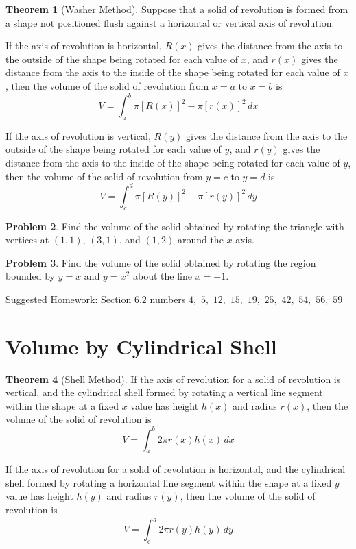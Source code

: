 \documentclass[letterpaper, twoside, 12pt]{book}
\theoremstyle{definition}
\newtheorem{theorem}{Theorem}
\theoremstyle{definition}
\newtheorem{problem}[theorem]{Problem}
\begin{document}
\begin{theorem}[Washer Method]
  Suppose that a solid of revolution is formed from a shape not positioned flush
  against a horizontal or vertical axis of revolution.

  If the axis of revolution is horizontal, $R(x)$ gives the distance from the
  axis to the outside of the shape being rotated for each value of $x$, and
  $r(x)$ gives the distance from the axis to the inside of the shape being
  rotated for each value of $x$,
  then the volume of the solid of revolution from $x=a$ to $x=b$ is
  \[
    V = \int_a^b \pi [R(x)]^2-\pi [r(x)]^2\, dx
  \]

  If the axis of revolution is vertical, $R(y)$ gives the distance from the
  axis to the outside of the shape being rotated for each value of $y$, and
  $r(y)$ gives the distance from the axis to the inside of the shape being
  rotated for each value of $y$,
  then the volume of the solid of revolution from $y=c$ to $y=d$ is
  \[
    V = \int_c^d \pi [R(y)]^2-\pi [r(y)]^2\, dy
  \]
\end{theorem}

\begin{problem}
 Find the volume of the solid obtained by rotating the triangle with
 vertices at $(1,1)$, $(3,1)$, and $(1,2)$ around the $x$-axis.
\end{problem}

\vfill

\begin{problem}
 Find the volume of the solid obtained by rotating the region bounded by
 $y=x$ and $y=x^2$ about the line $x = -1$.
\end{problem}

\vfill

\noindent Suggested Homework: Section $6.2$ numbers $4,$ $5,$ $12,$ $15,$ $19,$ $25,$ $42,$ $54,$ $56,$ $59$
\newpage

\section{Volume by Cylindrical Shell}

\begin{theorem}[Shell Method]
  If the axis of revolution for a solid of revolution is vertical,
  and the cylindrical shell formed by rotating a vertical line segment within
  the shape at a fixed $x$ value has height $h(x)$ and radius $r(x)$,
  then the volume of the solid of revolution is
  \[
    V = \int_a^b 2\pi r(x)h(x)\, dx
  \]

  If the axis of revolution for a solid of revolution is horizontal,
  and the cylindrical shell formed by rotating a horizontal line segment within
  the shape at a fixed $y$ value has height $h(y)$ and radius $r(y)$,
  then the volume of the solid of revolution is
  \[
    V = \int_c^d 2\pi r(y)h(y)\, dy
  \]
\end{theorem}
\end{document}
